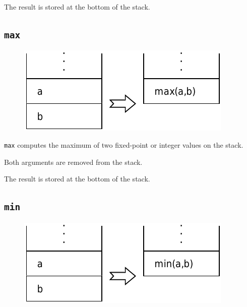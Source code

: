 			The result is stored at the bottom of the stack.
	
	\qquad
	
	\subsection*{\texttt{max}}
	
		\begin{figure}
			\begin{flushright}
				\includegraphics[width=\linewidth]{figure/pdf/i_max} 
			\end{flushright}
		\end{figure}
	
			\texttt{max} computes the maximum of two fixed-point or integer
			values on the stack. 
	
			Both arguments are removed from the stack. 
	
			The result is stored at the bottom of the stack.
	
	\qquad
	
	\subsection*{\texttt{min}}
	
		\begin{figure}
			\begin{flushright}
				\includegraphics[width=\linewidth]{figure/pdf/i_min} 
			\end{flushright}
		\end{figure}
	
